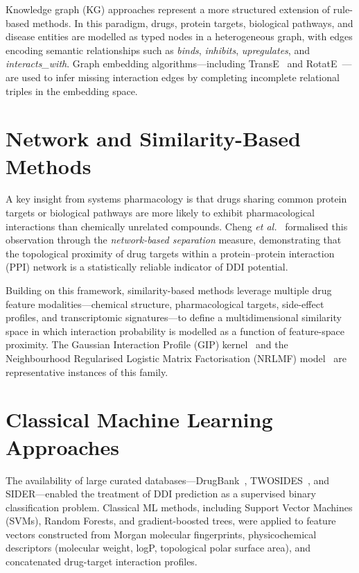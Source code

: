 \documentclass[12pt,a4paper,oneside]{report}
\begin{document}
Knowledge graph (KG) approaches represent a more structured extension of rule-based methods.
In this paradigm, drugs, protein targets, biological pathways, and disease entities are
modelled as typed nodes in a heterogeneous graph, with edges encoding semantic relationships
such as \textit{binds}, \textit{inhibits}, \textit{upregulates}, and
\textit{interacts\_with}. Graph embedding algorithms---including TransE~\cite{bordes2013translating}
and RotatE~\cite{sun2019rotate}---are used to infer missing interaction edges by completing
incomplete relational triples in the embedding space.

\section{Network and Similarity-Based Methods}

A key insight from systems pharmacology is that drugs sharing common protein targets or
biological pathways are more likely to exhibit pharmacological interactions than chemically
unrelated compounds. Cheng \textit{et al.}~\cite{cheng2012network} formalised this
observation through the \textit{network-based separation} measure, demonstrating that the
topological proximity of drug targets within a protein--protein interaction (PPI) network
is a statistically reliable indicator of DDI potential.

Building on this framework, similarity-based methods leverage multiple drug feature
modalities---chemical structure, pharmacological targets, side-effect profiles, and
transcriptomic signatures---to define a multidimensional similarity space in which
interaction probability is modelled as a function of feature-space proximity. The Gaussian
Interaction Profile (GIP) kernel~\cite{van2011gaussian} and the Neighbourhood Regularised
Logistic Matrix Factorisation (NRLMF) model~\cite{liu2016neighborhood} are representative
instances of this family.

\section{Classical Machine Learning Approaches}

The availability of large curated databases---DrugBank~\cite{wishart2018drugbank},
TWOSIDES~\cite{tatonetti2012data}, and SIDER---enabled the treatment of DDI prediction as a
supervised binary classification problem. Classical ML methods, including Support Vector
Machines (SVMs), Random Forests, and gradient-boosted trees, were applied to feature vectors
constructed from Morgan molecular fingerprints, physicochemical descriptors (molecular weight,
logP, topological polar surface area), and concatenated drug-target interaction profiles.
\end{document}
